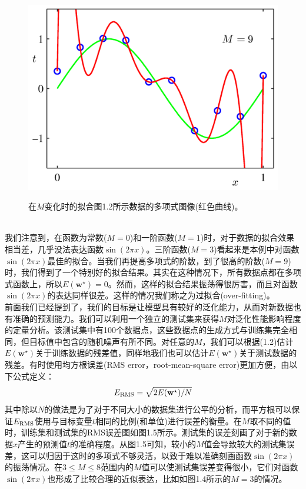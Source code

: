 \documentclass[b5paper]{book}
\numberwithin{equation}{chapter}
\begin{document}
{\begin{figure}[ht]
\begin{minipage}[t]{0.5\linewidth}
		\includegraphics[scale=0.8]{Images/1-4d.png}
		\label{fig:1-4d}
		\end{minipage}
		\caption{在$M$变化时的拟合图1.2所示数据的多项式图像(红色曲线)。}
	\end{figure}
	\\
	\indent 我们注意到，在函数为常数($M=0$)和一阶函数($M=1$)时，对于数据的拟合效果相当差，几乎没法表达函数$\sin (2 \pi x)$。三阶函数($M=3$)看起来是本例中对函数$\sin (2 \pi x)$最佳的拟合。当我们再提高多项式的阶数，到了很高的阶数($M=9$)时，我们得到了一个特别好的拟合结果。其实在这种情况下，所有数据点都在多项式函数上，所以$E(\mathbf{w^\star})=0$。然而，这样的拟合结果振荡得很厉害，而且对函数$\sin (2 \pi x)$的表达同样很差。这样的情况我们称之为过拟合(over-fitting)。\\
	\indent 前面我们已经提到了，我们的目标是让模型具有较好的泛化能力，从而对新数据也有准确的预测能力。我们可以利用一个独立的测试集来获得$M$对泛化性能影响程度的定量分析。该测试集中有100个数据点，这些数据点的生成方式与训练集完全相同，但目标值中包含的随机噪声有所不同。对任意的$M$，我们可以根据(1.2)估计$E(\mathbf{w^\star})$关于训练数据的残差值，同样地我们也可以估计$E(\mathbf{w^\star})$关于测试数据的残差。有时使用均方根误差(RMS error，root-mean-square error)更加方便，由以下公式定义：
	\begin{equation}
	E_{\textnormal{RMS}}=\sqrt{2E(\mathbf{w^\star})/N}
	\end{equation}
	其中除以$N$的做法是为了对于不同大小的数据集进行公平的分析，而平方根可以保证$E_{\textnormal{RMS}}$使用与目标变量$t$相同的比例(和单位)进行误差的衡量。在$M$取不同的值时，训练集和测试集的RMS误差图如图1.5所示。测试集的误差刻画了对于新的数据$x$产生的预测值$t$的准确程度。从图1.5可知，较小的$M$值会导致较大的测试集误差，这可以归因于这时的多项式不够灵活，以致于难以准确刻画函数$\sin (2 \pi x)$的振荡情况。在$3 \leqslant M \leqslant 8$范围内的$M$值可以使测试集误差变得很小，它们对函数$\sin (2 \pi x)$也形成了比较合理的近似表达，比如如图1.4所示的$M=3$的情况。\\
}
\end{document}
